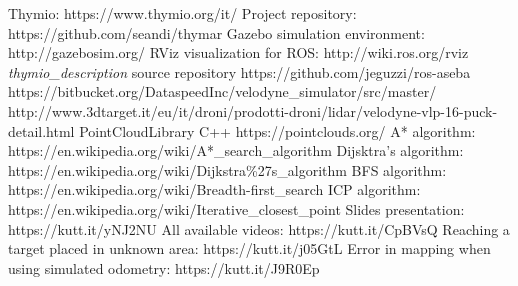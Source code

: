 \documentclass[9pt,conference]{IEEEtran}
\begin{document}


{\small
	
	
}

\begin{thebibliography}{1}
     Thymio: https://www.thymio.org/it/
     Project repository: https://github.com/seandi/thymar
     Gazebo simulation environment: http://gazebosim.org/
     RViz visualization for ROS: http://wiki.ros.org/rviz
	 \textit{thymio\_description} source repository https://github.com/jeguzzi/ros-aseba
	 https://bitbucket.org/DataspeedInc/velodyne\_simulator/src/master/
	 http://www.3dtarget.it/eu/it/droni/prodotti-droni/lidar/velodyne-vlp-16-puck-detail.html
	 PointCloudLibrary C++ https://pointclouds.org/
	 A* algorithm: https://en.wikipedia.org/wiki/A*\_search\_algorithm
	 Dijsktra's algorithm: https://en.wikipedia.org/wiki/Dijkstra\%27s\_algorithm
	 BFS algorithm: https://en.wikipedia.org/wiki/Breadth-first\_search
	 ICP algorithm: https://en.wikipedia.org/wiki/Iterative\_closest\_point
	 Slides presentation: https://kutt.it/yNJ2NU
	 All available videos: https://kutt.it/CpBVsQ
	 Reaching a target placed in unknown area: https://kutt.it/j05GtL
	 Error in mapping when using simulated odometry: https://kutt.it/J9R0Ep
\end{thebibliography}
\end{document}
